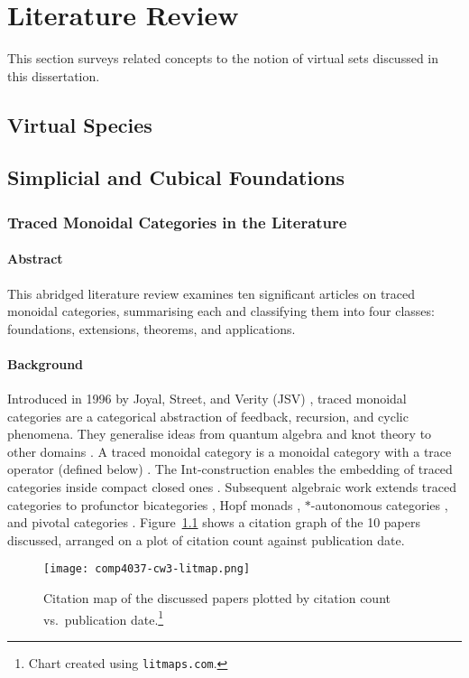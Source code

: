 \chapter{Literature Review}

This section surveys related concepts to the notion of virtual sets discussed in this dissertation.

\section{Virtual Species}
\section{Simplicial and Cubical Foundations}

\subsection{Traced Monoidal Categories in the Literature}
\subsubsection*{Abstract}
This abridged literature review examines ten significant articles on traced
monoidal categories, summarising each and classifying them into four classes:
foundations, extensions, theorems, and applications.
\subsubsection*{Background}
Introduced in 1996 by Joyal, Street, and Verity (JSV)
\cite{joyal1996-traced-monoidal-categories}, traced monoidal categories are a
categorical abstraction of feedback, recursion, and cyclic phenomena. They
generalise ideas from quantum algebra and knot theory to other domains
\cite{reshetikhin1990-ribbon-graphs-invaraints}. A traced monoidal category is a
monoidal category with a trace operator (defined below)
\cite{hu2021-traced-monoidal-categories}. The $\mathrm{Int}$-construction
enables the embedding of traced categories inside compact closed ones
\cite{joyal1996-traced-monoidal-categories}. Subsequent algebraic work extends
traced categories to profunctor bicategories
\cite{hu2021-traced-monoidal-categories}, Hopf monads
\cite{bruguieres2011-hopf-monads-monoidal}, $*$-autonomous categories
\cite{hajgato2013-traced-autonomous-categories}, and pivotal categories
\cite{etingof2005-fusion-categories}. Figure~\ref{fig:litmap} shows a citation graph of the
10 papers discussed, arranged on a plot of citation count against publication
date.
\begin{figure}[ht]
	\centering
	\texttt{[image: comp4037-cw3-litmap.png]}
	\caption{Citation map of the discussed papers plotted by citation count vs.\ publication date.\protect\footnote{Chart created using \texttt{litmaps.com}.}}
	\label{fig:litmap}
\end{figure}
